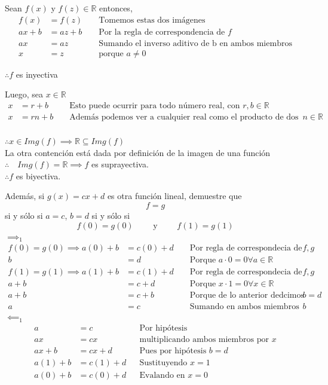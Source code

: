\documentclass[letterpaper]{article}
\newcommand{\R}{\mathds{R}}
\renewcommand{\*}{\cdot}
\theoremstyle{definition}
\begin{document}
Sean $ f(x) $ y $ f(z)  \in \R$ entonces,
\begin{align*}
	f(x) &= f(z) &&\text{ Tomemos estas dos imágenes }\\
	ax +b &= az + b &&\text{ Por la regla de correspondencia de } f\\
	ax &= az &&\text{ Sumando el inverso aditivo de b en ambos miembros}\\
	x &= z &&\text{ porque } a \neq 0
\end{align*}
\begin{center}
	$ \therefore f $ es inyectiva
\end{center}
Luego, sea $ x \in \R $
\begin{align*}
	x &= r + b &&\text{ Esto puede ocurrir para todo número real, con }r, b \in \R \\
	x &= rn + b &&\text{ Además podemos ver a cualquier real como el producto de dos reales }n \in \R \\
\end{align*}
\begin{center}
	$ \therefore x \in Img(f)  \implies \R \subseteq Img(f)$\\
	La otra contención está dada por definición de la imagen de una función\\
	$ \therefore \quad Img(f) = \R  \implies f$ es suprayectiva.\\
	$ \therefore f $ es biyectiva.
\end{center}
Además, si $ g(x) = cx + d $ es otra función lineal, demuestre que \[f = g\] si y sólo si $a = c $, $ b = d $ si y sólo si \[ f(0) = g(0) \qquad \text{ y } \qquad f(1) = g(1) \]
$ \implies_1 $
\begin{align*}
	f(0) = g(0) \implies a(0) + b &= c(0) + d && \text{ Por regla de correspondecia de } f, g\\
	b &= d && \text{ Porque } a\* 0 = 0 \forall a \in \R 
\end{align*}
\begin{align*}
	f(1) = g(1) \implies a(1) + b &= c(1) + d && \text{ Por regla de correspondecia de } f, g\\
	 a + b &=c + d && \text{ Porque } x\* 1 = 0 \forall x \in \R \\
	 a + b &=c + b && \text{ Porque de lo anterior dedcimos que } b = d \\
	 a &=c && \text{ Sumando en ambos miembros el inverso aditivo de  } b  
\end{align*}
$ \impliedby_1 $
\begin{align*}
	a &= c &&\text{Por hipótesis}\\
	ax &= cx &&\text{multiplicando ambos miembros por } x\\
	ax + b &= cx + d&&\text{Pues por hipótesis } b = d\\
	a(1) + b &= c(1) + d&&\text{Sustituyendo } x = 1\\
	a(0) + b &= c(0) + d&&\text{Evalando en } x = 0
\end{align*}
\end{document}
